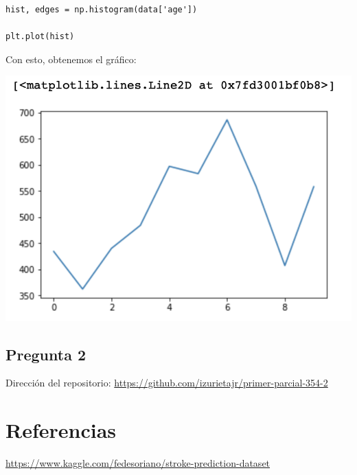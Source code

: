 \documentclass[letter]{article}
\begin{document}
\begin{verbatim}
hist, edges = np.histogram(data['age'])

plt.plot(hist)
\end{verbatim}

Con esto, obtenemos el gráfico:

\begin{center}
\includegraphics[width=.9\linewidth]{./img/hist.png}
\end{center}

\subsection{Pregunta 2}
\label{sec:org4178403}

Dirección del repositorio: \url{https://github.com/izurietajr/primer-parcial-354-2}

\section{Referencias}
\label{sec:orgf1e5609}

\url{https://www.kaggle.com/fedesoriano/stroke-prediction-dataset}
\end{document}
